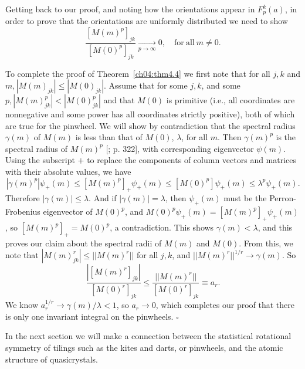 \documentclass[reqno]{stml-l}
\theoremstyle{plain}
\theoremstyle{definition}
\numberwithin{equation}{chapter}
\begin{document}
Getting back to our proof, and noting how the orientations appear in $F_{p}^{k}(a)$, in order to prove that the orientations are uniformly distributed we need to show
\begin{equation}\label{ch04:eqn4.13}
\frac{[M(m)^{p}]_{jk}}{[M(0)^{p}]_{jk}}\mathop{\longrightarrow}\limits_{p\rightarrow\infty}0, \quad \mathrm{for\ all}\ m \neq 0.
\end{equation}

To complete the proof of Theorem~\ref{ch04:thm4.4} we first note that for all $j,k$ and $m,|M(m)_{jk}|\leq|M(0)_{jk}|$. Assume that for some $j,k$, and some $p,|M(m)_{jk}^{p}|<|M(0)_{jk}^{p}|$ and that $M(0)$ is primitive (i.e., all coordinates are nonnegative and some power has all coordinates strictly positive), both of which are true for the pinwheel. We will show by contradiction that the spectral radius $\gamma(m)$ of $M(m)$ is less than that of $M(0)$, $\lambda$, for all $m$. Then $\gamma(m)^{p}$ is the spectral radius of $M(m)^{p}$ [; p. 322], with corresponding eigenvector $\psi(m)$. Using the subscript $+$ to replace the components of column vectors and matrices with their absolute values, we have
\begin{equation}\label{ch04:eqn4.14}
|\gamma(m)^{p}|\psi_{+}(m)\leq[M(m)^{p}]_{+}\psi_{+}(m)\leq[M(0)^{p}]\psi_{+}(m)\leq\lambda^{p}\psi_{+}(m). \end{equation}
Therefore $|\gamma(m)|\leq\lambda$. And if $|\gamma(m)|=\lambda$, then $\psi_{+}(m)$ must be the Perron-Frobenius eigenvector of $M(0)^{p}$, and $M(0)^{p}\psi_{+}(m)=[M(m)^{p}]_{+}\psi_{+}(m)$, so $[M(m)^{p}]_{+}=M(0)^{p}$, a contradiction. This shows $\gamma(m)<\lambda$, and this proves our claim about the spectral radii of $M(m)$ and $M(0)$. From this, we note that $|M(m)_{jk}^{r}|\leq||M(m)^{r}||$ for all $j,k$, and $||M(m)^{r}||^{1/r}\longrightarrow\gamma(m)$. So
\begin{equation}\label{ch04:eqn4.15}
\frac{|[M(m)^{r}]_{jk}|}{[M(0)^{r}]_{jk}}\leq\frac{||M(m)^{r}||}{[M(0)^{r}]_{jk}}\equiv a_{r}.
\end{equation}
We know $a_{r}^{1/r}\longrightarrow\gamma(m)/\lambda<1$, so $a_{r}\rightarrow 0$, which completes our proof that there is only one invariant integral on the pinwheels.
\hfill$\square$

In the next section we will make a connection between the statistical rotational symmetry of tilings such as the kites and darts, or pinwheels, and the atomic structure of quasicrystals.
\end{document}

